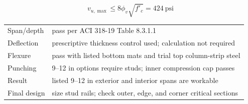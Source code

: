 \documentclass[10pt]{article}
\begin{document}

\begin{equation}
v_{u,\max}\leq8\phi_v\sqrt{f'_c}=424\ \text{psi}
\end{equation}


\par

{\ttfamily\footnotesize
\begin{tabular}{@{}p{1.30in}p{5.40in}@{}}
Span/depth & pass per ACI 318-19 Table 8.3.1.1 \\
Deflection & prescriptive thickness control used; calculation not required \\
Flexure & pass with listed bottom mats and trial top column-strip steel \\
Punching & 9--12 in options require studs; inner compression cap passes \\
Result & listed 9--12 in exterior and interior spans are workable \\
Final design & size stud rails; check outer, edge, and corner critical sections \\
\end{tabular}
}

\end{document}
